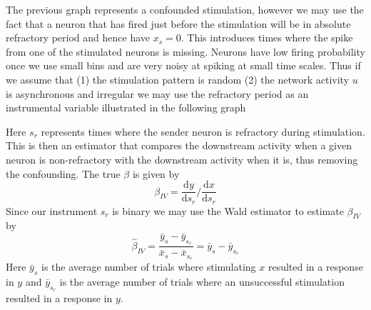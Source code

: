 \documentclass[11pt]{article}
\newcommand{\de}[2]{\frac{\mathrm{d} #1}{\mathrm{d} #2}}
\begin{document}
\begin{center}
\end{center}
The previous graph represents a confounded stimulation, however we may use the fact that a neuron that has fired just before the stimulation will be in absolute refractory period and hence have $ x_{s}=0 $. This introduces times where the spike from one of the stimulated neurons is missing. Neurons have low firing probability once we use small bins and are very noisy at spiking at small time scales. Thus if we assume that (1) the stimulation pattern is random (2) the network activity $ u $ is asynchronous and irregular we may use the refractory period as an instrumental variable illustrated in the following graph

\begin{center}
\end{center}
Here $ s_r $ represents times where the sender neuron is refractory during stimulation. This is then an estimator that compares the downstream activity when a given neuron is non-refractory with the downstream activity when it is, thus removing the confounding. The true $ \beta $ is given by
\begin{equation}
\beta_{IV} = \de{y}{s_r} / \de{x}{s_r}
\end{equation}
Since our instrument $ s_r $ is binary we may use the Wald estimator  to estimate $ \beta_{IV} $ by
\begin{equation}
 \hat{\beta}_{IV} = \frac{\bar{y}_{s} - \bar{y}_{s_r}}{\bar{x}_{s} - \bar{x}_{s_r}} = \bar{y}_{s} - \bar{y}_{s_r}
 \label{eq:wald}
\end{equation}
Here $ \bar{y}_s $ is the average number of trials where stimulating $ x $ resulted in a response in $ y $ and $ \bar{y}_{s_r} $ is the average number of trials where an unsuccessful stimulation resulted in a response in $ y $.
\end{document}
